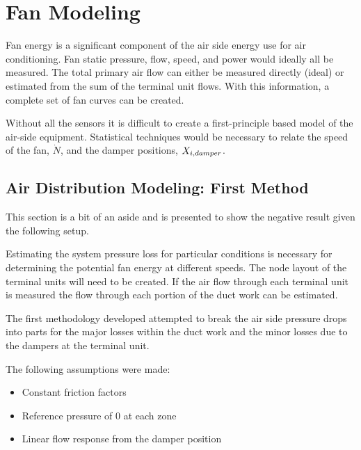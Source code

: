 

\section{Fan Modeling}\label{sec:FanModeling}

Fan energy is a significant component of the air side energy use for air
conditioning. Fan static pressure, flow, speed, and power would ideally
all be measured.  The total primary air flow can either be measured
directly (ideal) or estimated from the sum of the terminal
unit flows. With this information, a complete set of fan curves can be
created.

Without all the sensors it is difficult to create a first-principle based model
of the air-side equipment. Statistical techniques would be necessary to relate
the speed of the fan, \(\dot N\), and the damper positions,
\(X_{i,damper}\).

\subsection{Air Distribution Modeling: First Method}
This section is a bit of an aside and is presented to show the negative
result given the following setup.

Estimating the system pressure loss for particular conditions is
necessary for determining the potential fan energy at different speeds.
The node layout of the terminal units will need to be created. If the air
flow through each terminal unit is measured the flow through each
portion of the duct work can be estimated.

The first methodology developed attempted to break the air side pressure
drops into parts for the major losses within the duct work and the minor
losses due to the dampers at the terminal unit.

The following assumptions were made:

\begin{itemize}
    \item Constant friction factors
    \item Reference pressure of 0 at each zone
    \item Linear flow response from the damper position
\end{itemize}


